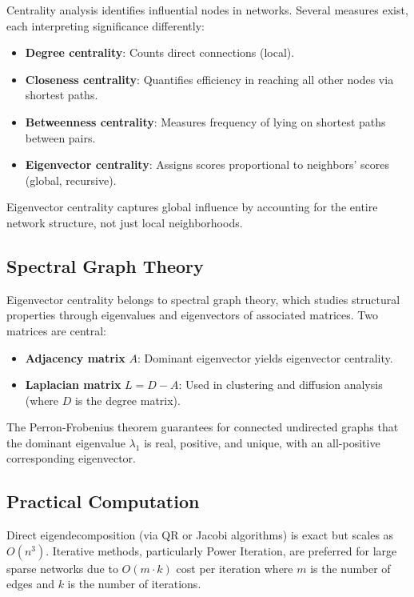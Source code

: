 \documentclass[12pt]{article}
\begin{document}
Centrality analysis identifies influential nodes in networks. Several measures exist, each interpreting significance differently:

\begin{itemize}
    \item \textbf{Degree centrality}: Counts direct connections (local).
    \item \textbf{Closeness centrality}: Quantifies efficiency in reaching all other nodes via shortest paths.
    \item \textbf{Betweenness centrality}: Measures frequency of lying on shortest paths between pairs.
    \item \textbf{Eigenvector centrality}: Assigns scores proportional to neighbors' scores (global, recursive).
\end{itemize}

Eigenvector centrality captures global influence by accounting for the entire network structure, not just local neighborhoods.

\subsection{Spectral Graph Theory}

Eigenvector centrality belongs to spectral graph theory, which studies structural properties through eigenvalues and eigenvectors of associated matrices. Two matrices are central:

\begin{itemize}
    \item \textbf{Adjacency matrix} $A$: Dominant eigenvector yields eigenvector centrality.
    \item \textbf{Laplacian matrix} $L = D - A$: Used in clustering and diffusion analysis (where $D$ is the degree matrix).
\end{itemize}

The Perron-Frobenius theorem guarantees for connected undirected graphs that the dominant eigenvalue $\lambda_1$ is real, positive, and unique, with an all-positive corresponding eigenvector.

\subsection{Practical Computation}

Direct eigendecomposition (via QR or Jacobi algorithms) is exact but scales as $O(n^3)$. Iterative methods, particularly Power Iteration, are preferred for large sparse networks due to $O(m \cdot k)$ cost per iteration where $m$ is the number of edges and $k$ is the number of iterations.
\end{document}
